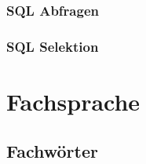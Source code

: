 \documentclass[12pt,a4paper]{article}
\begin{document}
\subsubsection{SQL Abfragen}
    
\subsubsection{SQL Selektion}

\section{Fachsprache}

\subsection{Fachwörter}
\end{document}
